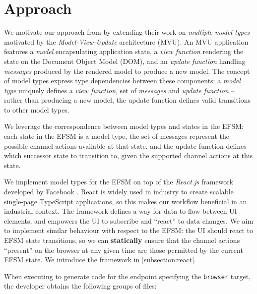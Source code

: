 \section{Approach}
We motivate our approach from \cite{MVU2020} by extending
their work on \textit{multiple model types} motivated by the
\textit{Model-View-Update} architecture (MVU).
An MVU application features a \textit{model} encapsulating application
state, a \textit{view function} rendering the state on the 
Document Object Model (DOM), and an
\textit{update function} handling \textit{messages} produced by the
rendered model to produce a new model.
The concept of model types express type dependencies between these
components: a \emph{model type} uniquely defines a \textit{view function},
set of \textit{messages} and \textit{update function} -- rather than
producing a new model, the update function defines valid transitions to
other model types.

We leverage the correspondence between model types and states in the EFSM:
each state in the EFSM is a model type, the set of messages represent
the possible channel actions available at that state,
and the update function defines which successor state to transition to,
given the supported channel actions at this state.

We implement model types for the EFSM on top of the 
\emph{React.js} framework developed by Facebook \cite{React}.
React is widely used in industry to create scalable single-page
TypeScript applications, so this makes our workflow beneficial in an
industrial context. 
The framework defines a way for data to flow
between UI elements, and empowers the UI to subscribe and
``react'' to data changes.
We aim to implement similar behaviour with respect to the EFSM:
the UI should react to EFSM state transitions,
so we can \textbf{statically} ensure that the
channel actions ``present'' on the browser at any given time
are those permitted by the current EFSM state.
We introduce the framework in \cref{subsection:react}.

When executing  to generate code
for the  endpoint specifying the
\texttt{browser} target, the developer obtains the following 
groups of files:

